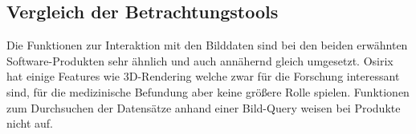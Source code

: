 \subsection{Vergleich der Betrachtungstools}
\label{sec:Vergleich der Betrachtungstools}
Die Funktionen zur Interaktion mit den Bilddaten sind bei den beiden erwähnten Software-Produkten sehr ähnlich und auch annähernd gleich umgesetzt.
Osirix hat einige Features wie 3D-Rendering welche zwar für die Forschung interessant sind, für die medizinische Befundung aber keine größere Rolle spielen.
Funktionen zum Durchsuchen der Datensätze anhand einer Bild-Query weisen bei Produkte nicht auf.


